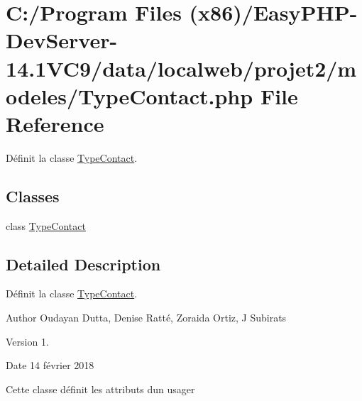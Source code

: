 \hypertarget{_type_contact_8php}{}\section{C\+:/\+Program Files (x86)/\+Easy\+P\+H\+P-\/\+Dev\+Server-\/14.1\+V\+C9/data/localweb/projet2/modeles/\+Type\+Contact.php File Reference}
\label{_type_contact_8php}


Définit la classe \hyperlink{class_type_contact}{Type\+Contact}.  


\subsection*{Classes}
\begin{DoxyCompactItemize}
\item 
class \hyperlink{class_type_contact}{Type\+Contact}
\end{DoxyCompactItemize}


\subsection{Detailed Description}
Définit la classe \hyperlink{class_type_contact}{Type\+Contact}. 

\begin{DoxyAuthor}{Author}
Oudayan Dutta, Denise Ratté, Zoraida Ortiz, J Subirats 
\end{DoxyAuthor}
\begin{DoxyVersion}{Version}
1. 
\end{DoxyVersion}
\begin{DoxyDate}{Date}
14 février 2018
\end{DoxyDate}
Cette classe définit les attributs d\textquotesingle{}un usager 